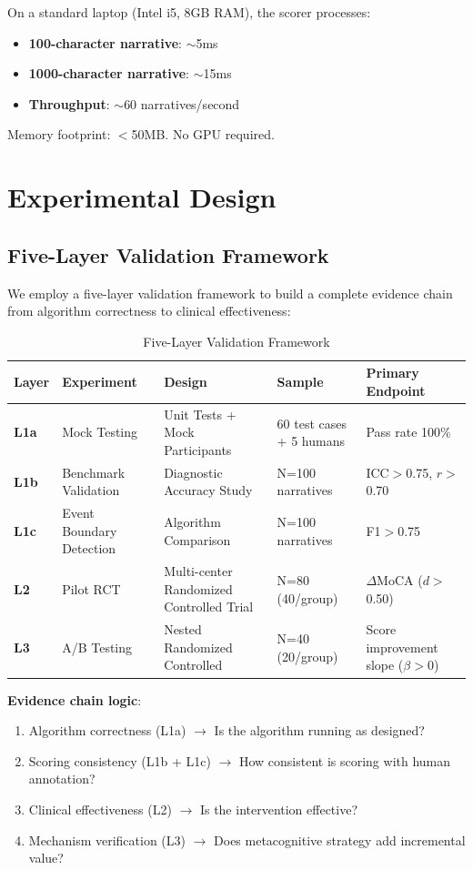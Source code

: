 \documentclass[11pt]{article}
\begin{document}
On a standard laptop (Intel i5, 8GB RAM), the scorer processes:
\begin{itemize}
    \item \textbf{100-character narrative}: $\sim$5ms
    \item \textbf{1000-character narrative}: $\sim$15ms
    \item \textbf{Throughput}: $\sim$60 narratives/second
\end{itemize}

Memory footprint: $<$50MB. No GPU required.

\section{Experimental Design}
\label{sec:experimental-design}

\subsection{Five-Layer Validation Framework}

We employ a five-layer validation framework to build a complete evidence chain from algorithm correctness to clinical effectiveness:

\begin{table}[h]
\centering
\caption{Five-Layer Validation Framework}
\label{tab:validation-layers}
\begin{tabular}{lllll}
\toprule
\textbf{Layer} & \textbf{Experiment} & \textbf{Design} & \textbf{Sample} & \textbf{Primary Endpoint} \\
\midrule
\textbf{L1a} & Mock Testing & Unit Tests + Mock Participants & 60 test cases + 5 humans & Pass rate 100\% \\
\textbf{L1b} & Benchmark Validation & Diagnostic Accuracy Study & N=100 narratives & ICC$>$0.75, $r>$0.70 \\
\textbf{L1c} & Event Boundary Detection & Algorithm Comparison & N=100 narratives & F1$>$0.75 \\
\textbf{L2} & Pilot RCT & Multi-center Randomized Controlled Trial & N=80 (40/group) & $\Delta$MoCA ($d>$0.50) \\
\textbf{L3} & A/B Testing & Nested Randomized Controlled & N=40 (20/group) & Score improvement slope ($\beta>$0) \\
\bottomrule
\end{tabular}
\end{table}

\textbf{Evidence chain logic}:
\begin{enumerate}
    \item Algorithm correctness (L1a) $\rightarrow$ Is the algorithm running as designed?
    \item Scoring consistency (L1b + L1c) $\rightarrow$ How consistent is scoring with human annotation?
    \item Clinical effectiveness (L2) $\rightarrow$ Is the intervention effective?
    \item Mechanism verification (L3) $\rightarrow$ Does metacognitive strategy add incremental value?
\end{enumerate}
\end{document}

